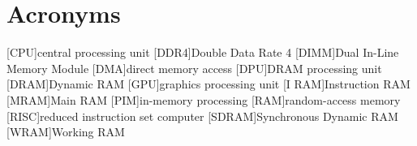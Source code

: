 \section{Acronyms}

\begin{acronym}
	[CPU]{central processing unit}
	[DDR4]{Double Data Rate 4}
	[DIMM]{Dual In-Line Memory Module}
	[DMA]{direct memory access}
	[DPU]{\acs*{DRAM} processing unit}
	[DRAM]{Dynamic \acs*{RAM}}
	[GPU]{graphics processing unit}
	[I\kern1pt RAM]{Instruction \acs*{RAM}}
	[MRAM]{Main \acs*{RAM}}
	[PIM]{in-memory processing}
	[RAM]{random-access memory}
	[RISC]{reduced instruction set computer}
	[SDRAM]{Synchronous Dynamic \acs*{RAM}}
	[WRAM]{Working \acs*{RAM}}
\end{acronym}
